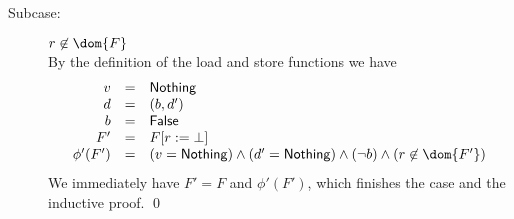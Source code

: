 {\begin{description}
\begin{description}
\item[Subcase:] $r \not\in \dom{F}$\\[1ex]
%
By the definition of the load and store functions we have 
\[ 
\begin{array}{rcll}
v &=& \Nothing\\
d &=& (b,d')\\
b &=& \False\\
F' &=& \FDelete{F}{r}\\
\phi'(F') &=& (v = \Nothing) \wedge (d' = \Nothing) \wedge (\neg b) \wedge  (r \not\in \dom{F'})
\end{array}
\]
We immediately have $F' = F$ and $\phi'(F')$, which finishes the case
and the inductive proof. \hfill \qed
\end{description}
\end{description}
}

